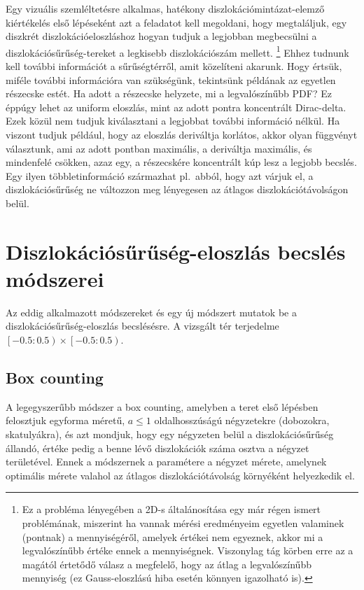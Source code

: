 \documentclass[10pt,a4paper]{scrartcl}
\begin{document}
Egy vizuális szemléltetésre alkalmas, hatékony diszlokációmintázat-elemző kiértékelés első lépéseként azt a feladatot kell megoldani, hogy megtaláljuk, egy diszkrét diszlokációeloszláshoz hogyan tudjuk a legjobban megbecsülni a diszlokációsűrűség-tereket a legkisebb diszlokációszám mellett.
\footnote{Ez a probléma lényegében a 2D-s általánosítása egy már régen ismert problémának, miszerint ha vannak mérési eredményeim egyetlen valaminek (pontnak) a mennyiségéről, amelyek értékei nem egyeznek, akkor mi a legvalószínűbb értéke ennek a mennyiségnek. Viszonylag tág körben erre az a magától értetődő válasz a megfelelő, hogy az átlag a legvalószínűbb mennyiség (ez Gauss-eloszlású hiba esetén könnyen igazolható is).} Ehhez tudnunk kell további információt a sűrűségtérről, amit közelíteni akarunk. Hogy értsük, miféle további információra van szükségünk, tekintsünk példának az egyetlen részecske estét. Ha adott a részecske helyzete, mi a legvalószínűbb PDF? Ez éppúgy lehet az uniform eloszlás, mint az adott pontra koncentrált Dirac-delta. Ezek közül nem tudjuk kiválasztani a legjobbat további információ nélkül. Ha viszont tudjuk például, hogy az eloszlás deriváltja korlátos, akkor olyan függvényt választunk, ami az adott pontban maximális, a deriváltja maximális, és mindenfelé csökken, azaz egy, a részecskére koncentrált kúp lesz a legjobb becslés. Egy ilyen többletinformáció származhat pl.\ abból, hogy azt várjuk el, a diszlokációsűrűség ne változzon meg lényegesen az átlagos diszlokációtávolságon belül.

\section{Diszlokációsűrűség-eloszlás becslés módszerei}
Az eddig alkalmazott módszereket és egy új módszert mutatok be a diszlokációsűrűség-eloszlás becslésésre. A vizsgált tér terjedelme $\left[ { - 0.5:0.5} \right) \times \left[ { - 0.5:0.5} \right)$.

\subsection{Box counting}
A legegyszerűbb módszer a box counting, amelyben a teret első lépésben felosztjuk egyforma méretű, $a \le 1$ oldalhosszúságú négyzetekre (dobozokra, skatulyákra), és azt mondjuk, hogy egy négyzeten belül a diszlokációsűrűség állandó, értéke pedig a benne lévő diszlokációk száma osztva a négyzet területével. Ennek a módszernek a paramétere a négyzet mérete, amelynek optimális mérete valahol az átlagos diszlokációtávolság környéként helyezkedik el.
\end{document}
